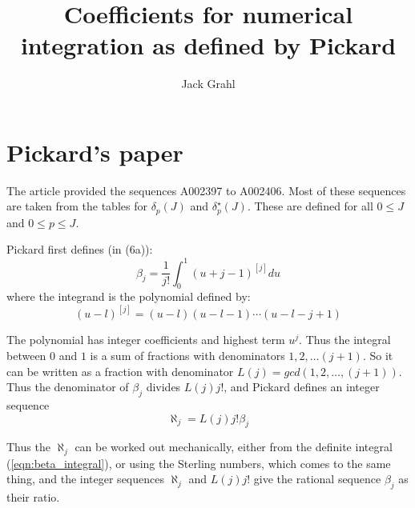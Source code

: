 \documentclass{article}
\title{Coefficients for numerical integration as defined by Pickard}
\author{Jack Grahl}
\begin{document}
\maketitle

\section{Pickard's paper}
The article \cite{pickard} provided the sequences A002397 to A002406. Most of these sequences are taken from the tables for $\delta_p(J)$ and $\delta^{\star}_p(J)$. These are defined for all $0 \leq J$ and $0 \leq p \leq J$.

Pickard first defines (in (6a)):
\begin{equation}\label{eqn:beta_integral}
 \beta_j = \frac{1}{j!}\int_0^1 (u + j - 1)^{[j]} du 
\end{equation}
where the integrand is the polynomial defined by:
\[ (u - l)^{[j]} = (u - l)(u - l - 1)\cdots(u - l - j + 1) \]

The polynomial has integer coefficients and highest term $u^{j}$.
Thus the integral between $0$ and $1$ is a sum of fractions with denominators $1, 2, \ldots (j+1)$.
So it can be written as a fraction with denominator $L(j) = gcd(1, 2, \ldots, (j+1))$.
Thus the denominator of $\beta_j$ divides $L(j)j!$, and Pickard defines an integer sequence
\[ \aleph_j = L(j)j!\beta_j \]

Thus the $\aleph_j$ can be worked out mechanically, either from the definite integral (\ref{eqn:beta_integral}), or using the Sterling numbers, which comes to the same thing, and the integer sequences $\aleph_j$ and $L(j)j!$ give the rational sequence $\beta_j$ as their ratio.





\end{document}
